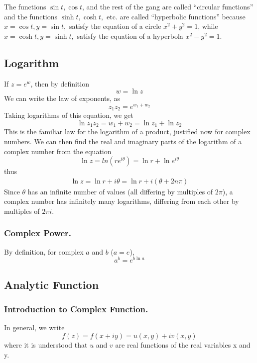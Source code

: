 \documentclass[../../../main.tex]{subfiles}
\begin{document}
The functions $\sin t, \cos t$, and the rest of the gang are called “circular functions” and the functions $\sinh t, \cosh t,$ etc. are called “hyperbolic functions” because $ x = \cos t, y = \sin t,$ satisfy the equation of a circle $x^2 + y^2 = 1$, while $x = \cosh t,  y = \sinh t,$ satisfy the equation of a hyperbola $x^2 - y^2 = 1$.

\subsection{Logarithm}
If $z=e^w$, then by deﬁnition
\begin{equation*}
    w=\ln z
\end{equation*}
We can write the law of exponents, as
\begin{equation*}
    z_1z_2 = e^{w_1+w_2}
\end{equation*}
Taking logarithms of this equation, we get
\begin{equation*}
    \ln z_1z_2 = {w_1+w_2}=\ln z_1+\ln z_2
\end{equation*}
This is the familiar law for the logarithm of a product, justiﬁed now for complex numbers. We can then ﬁnd the real and imaginary parts of the logarithm of a complex number from the equation
\begin{equation*}
    \ln z = ln(re^{i\theta})=\ln r+\ln e^{i\theta}
\end{equation*}
thus
\begin{align*}
    \ln z = \ln r + i\theta= \ln r + i(\theta+2n\pi)
\end{align*}
Since $\theta$ has an inﬁnite number of values (all diﬀering by multiples of $2\pi$), a complex number has inﬁnitely many logarithms, diﬀering from each other by multiples of $2\pi i$.

\subsubsection{Complex Power.} By deﬁnition, for complex $a$ and $b$ ($a = e$),
\begin{equation*}
    a^b=e^{b\ln a}
\end{equation*}

\subsection{Analytic Function}
\subsubsection{Introduction to Complex Function.} In general, we write
\begin{equation*}
    f(z) = f(x + iy) = u(x, y) + iv(x, y)
\end{equation*}
where it is understood that $u$ and $v$ are real functions of the real variables x and y.
\end{document}
